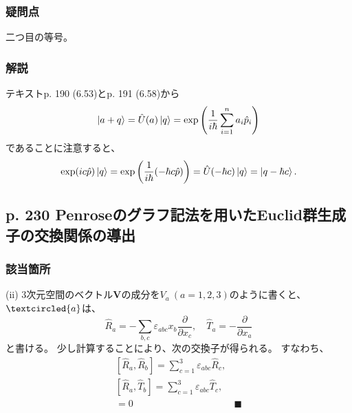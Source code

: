 \documentclass{jsarticle}
\begin{document}
\subsubsection*{疑問点}
二つ目の等号。

\subsubsection*{解説}
テキストp. 190 (6.53)とp. 191 (6.58)から
\begin{equation*}
    \ket{a+q}
    =
    \hat{U}(a)\ket{q}
    =
    \exp\left(
        \dfrac{1}{i\hbar}\sum_{i=1}^na_i\hat{p}_i
    \right)
\end{equation*}
であることに注意すると、
\begin{equation*}
    \exp(ic\hat{p})\ket{q}
    =
    \exp\left(
        \dfrac{1}{i\hbar}(-\hbar c\hat{p})
    \right)
    =
    \hat{U}(-\hbar c)\ket{q}
    =
    \ket{q-\hbar c}.
\end{equation*}


\subsection*{p. 230 Penroseのグラフ記法を用いたEuclid群生成子の交換関係の導出}

\subsubsection*{該当箇所}

(ii) 3次元空間のベクトル$\bm{V}$の成分を$V_a\:(a=1,2,3)$のように書くと、$\textcircled{a}$は、
\begin{equation*}
    \hat{R}_a=-\sum_{b, c}\varepsilon_{abc}x_b\dfrac{\partial}{\partial x_c},\quad \hat{T}_a=-\dfrac{\partial}{\partial x_a}
\end{equation*}
と書ける。
少し計算することにより、次の交換子が得られる。
すなわち、
\begin{equation*}
    \tag{7.36}
    \begin{array}{lr}
        \displaystyle
        [\hat{R}_a, \hat{R}_b]
        =
        \sum_{c=1}^3\varepsilon_{abc}\hat{R}_c,
        \\
        \displaystyle
        [\hat{R}_a, \hat{T}_b]
        =
        \sum_{c=1}^3\varepsilon_{abc}\hat{T}_c,
        \\
        [\hat{T}_a, \hat{T}_b]
        =0
        &\blacksquare
    \end{array}
\end{equation*}
\end{document}

